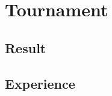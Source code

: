 \documentclass[12pt, a4paper]{article}
\begin{document}
\section{Tournament}

\subsection{}

\subsection{Result}

\subsection{Experience}






 
\end{document}
